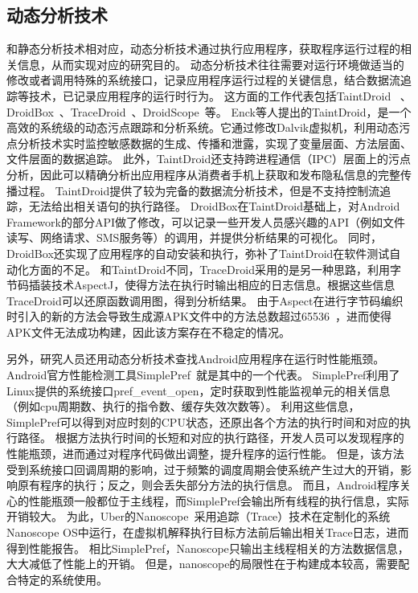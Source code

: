 \subsection{动态分析技术}

和静态分析技术相对应，动态分析技术通过执行应用程序，获取程序运行过程的相关信息，从而实现对应的研究目的。
动态分析技术往往需要对运行环境做适当的修改或者调用特殊的系统接口，记录应用程序运行过程的关键信息，结合数据流追踪等技术，已记录应用程序的运行时行为。
这方面的工作代表包括TaintDroid ~\cite{chun2014taintdroid}、DroidBox~\cite{droidbox:online}、TraceDroid~\cite{van2013dynamic}、DroidScope~\cite{droidscope}等。
Enck等人提出的TaintDroid，是一个高效的系统级的动态污点跟踪和分析系统。它通过修改Dalvik虚拟机，利用动态污点分析技术实时监控敏感数据的生成、传播和泄露，实现了变量层面、方法层面、文件层面的数据追踪。
此外，TaintDroid还支持跨进程通信（IPC）层面上的污点分析，因此可以精确分析出应用程序从消费者手机上获取和发布隐私信息的完整传播过程。
TaintDroid提供了较为完备的数据流分析技术，但是不支持控制流追踪，无法给出相关语句的执行路径。
DroidBox在TaintDroid基础上，对Android Framework的部分API做了修改，可以记录一些开发人员感兴趣的API（例如文件读写、网络请求、SMS服务等）的调用，并提供分析结果的可视化。
同时，DroidBox还实现了应用程序的自动安装和执行，弥补了TaintDroid在软件测试自动化方面的不足。
和TaintDroid不同，TraceDroid采用的是另一种思路，利用字节码插装技术AspectJ，使得方法在执行时输出相应的日志信息。根据这些信息TraceDroid可以还原函数调用图，得到分析结果。
由于Aspect在进行字节码编织时引入的新的方法会导致生成源APK文件中的方法总数超过65536~\cite{Configur27}，进而使得APK文件无法成功构建，因此该方案存在不稳定的情况。

另外，研究人员还用动态分析技术查找Android应用程序在运行时性能瓶颈。Android官方性能检测工具SimplePref~\cite{simpleperf:online}就是其中的一个代表。
SimplePref利用了Linux提供的系统接口pref\_event\_open，定时获取到性能监视单元的相关信息（例如cpu周期数、执行的指令数、缓存失效次数等）。
利用这些信息，SimplePref可以得到对应时刻的CPU状态，还原出各个方法的执行时间和对应的执行路径。
根据方法执行时间的长短和对应的执行路径，开发人员可以发现程序的性能瓶颈，进而通过对程序代码做出调整，提升程序的运行性能。
但是，该方法受到系统接口回调周期的影响，过于频繁的调度周期会使系统产生过大的开销，影响原有程序的执行；反之，则会丢失部分方法的执行信息。
而且，Android程序关心的性能瓶颈一般都位于主线程，而SimplePref会输出所有线程的执行信息，实际开销较大。
为此，Uber的Nanoscope~\cite{ubernanoscope:online}采用追踪（Trace）技术在定制化的系统Nanoscope OS中运行，在虚拟机解释执行目标方法前后输出相关Trace日志，进而得到性能报告。
相比SimplePref，Nanoscope只输出主线程相关的方法数据信息，大大减低了性能上的开销。
但是，nanoscope的局限性在于构建成本较高，需要配合特定的系统使用。


